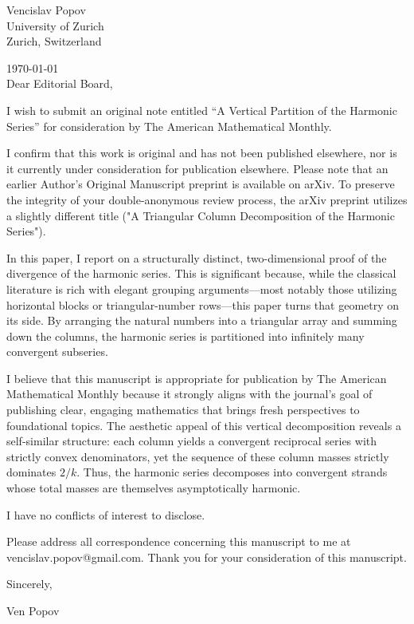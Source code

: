 \documentclass{letter}
\begin{document}
Vencislav Popov\\
University of Zurich\\
Zurich, Switzerland

\vspace{1pc}
\today\\

\vspace{1pc}
Dear Editorial Board, 

\vspace{6pt}
I wish to submit an original note entitled “A Vertical Partition of the Harmonic Series” for consideration by The American Mathematical Monthly. 

\vspace{6pt}
I confirm that this work is original and has not been published elsewhere, nor is it currently under consideration for publication elsewhere. Please note that an earlier Author's Original Manuscript preprint is available on arXiv. To preserve the integrity of your double-anonymous review process, the arXiv preprint utilizes a slightly different title ("A Triangular Column Decomposition of the Harmonic Series").

\vspace{6pt}
In this paper, I report on a structurally distinct, two-dimensional proof of the divergence of the harmonic series. This is significant because, while the classical literature is rich with elegant grouping arguments—most notably those utilizing horizontal blocks or triangular-number rows—this paper turns that geometry on its side. By arranging the natural numbers into a triangular array and summing down the columns, the harmonic series is partitioned into infinitely many convergent subseries.

\vspace{6pt}
I believe that this manuscript is appropriate for publication by The American Mathematical Monthly because it strongly aligns with the journal's goal of publishing clear, engaging mathematics that brings fresh perspectives to foundational topics. The aesthetic appeal of this vertical decomposition reveals a self-similar structure: each column yields a convergent reciprocal series with strictly convex denominators, yet the sequence of these column masses strictly dominates $2/k$. Thus, the harmonic series decomposes into convergent strands whose total masses are themselves asymptotically harmonic. 

\vspace{6pt}
I have no conflicts of interest to disclose. 

\vspace{6pt}
Please address all correspondence concerning this manuscript to me at vencislav.popov@gmail.com. Thank you for your consideration of this manuscript. 

\vspace{6pt}
Sincerely,

\vspace{6pt}
Ven Popov
\end{document}
